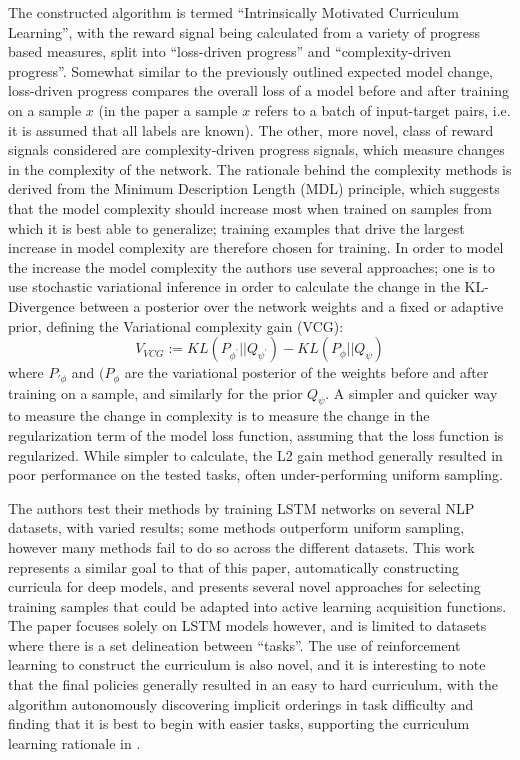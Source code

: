 \documentclass[a4paper,10.5pt]{article}
\begin{document}
The constructed algorithm is termed ``Intrinsically Motivated Curriculum Learning'', with the reward signal being calculated from a variety of progress based measures, split into ``loss-driven progress'' and ``complexity-driven progress''. Somewhat similar to the previously outlined expected model change, loss-driven progress compares the overall loss of a model before and after training on a sample $x$ (in the paper a sample $x$ refers to a batch of input-target pairs, i.e. it is assumed that all labels are known). The other, more novel, class of reward signals considered are complexity-driven progress signals, which measure changes in the complexity of the network. The rationale behind the complexity methods is derived from the Minimum Description Length (MDL) principle, which suggests that the model complexity should increase most when trained on samples from which it is best able to generalize; training examples that drive the largest increase in model complexity are therefore chosen for training. In order to model the increase the model complexity the authors use several approaches; one is to use stochastic variational inference \cite{Kingma 2015} in order to calculate the change in the KL-Divergence between a posterior over the network weights and a fixed or adaptive prior, defining the Variational complexity gain (VCG):
\begin{equation}
V_{VCG} := KL(P_{\phi^{\prime}} || Q_{\psi^{\prime}}) - KL(P_{\phi} || Q_{\psi})
\end{equation}
where $P_{\prime{\phi}}$ and $(P_{\phi}$ are the variational posterior of the weights before and after training on a sample, and similarly for the prior $Q_{\psi}$. A simpler and quicker way to measure the change in complexity is to measure the change in the regularization term of the model loss function, assuming that the loss function is regularized. While simpler to calculate, the L2 gain method generally resulted in poor performance on the tested tasks, often under-performing uniform sampling. 

The authors test their methods by training LSTM networks on several NLP datasets, with varied results; some methods outperform uniform sampling, however many methods fail to do so across the different datasets. This work represents a similar goal to that of this paper, automatically constructing curricula for deep models, and presents several novel approaches for selecting training samples that could be adapted into active learning acquisition functions. The paper focuses solely on LSTM models however, and is limited to datasets where there is a set delineation between ``tasks''. The use of reinforcement learning to construct the curriculum is also novel, and it is interesting to note that the final policies generally resulted in an easy to hard curriculum, with the algorithm autonomously discovering implicit orderings in task difficulty and finding that it is best to begin with easier tasks, supporting the curriculum learning rationale in \cite{Bengio 09}.
\end{document}
